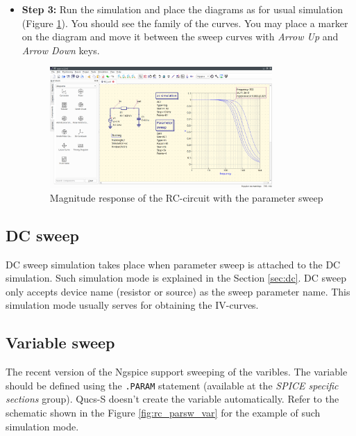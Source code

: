 \documentclass[a4paper,12pt]{article}
\begin{document}
\begin{itemize}
\item \textbf{Step 3:} Run the simulation and place the diagrams as for usual simulation (Figure \ref{fig:parsw_mr}). You should see the family of the curves. You may place a marker on the diagram and move it between the sweep curves with \emph{Arrow Up} and \emph{Arrow Down} keys.  
    
        \begin{figure}[!ht]
        \begin{center}
            \includegraphics[width=0.8\textwidth]{img/parsw_mr.png}
        \end{center}
        \caption{Magnitude response of the RC-circuit with the parameter sweep} 
    \label{fig:parsw_mr}
    \end{figure}
    
\end{itemize}


\subsection{DC sweep}

DC sweep simulation takes place when parameter sweep is attached to the DC simulation. Such simulation mode is explained in
the Section \ref{sec:dc}. DC sweep only accepts device name (resistor or source) as the sweep parameter name. This simulation mode
usually serves for obtaining the IV-curves. 

\subsection{Variable sweep}

The recent version of the Ngspice support sweeping of the varibles. The variable should be defined using the \verb|.PARAM| 
statement (available at the \emph{SPICE specific sections} group). Qucs-S doesn't create the variable automatically. Refer to the schematic shown in the Figure \ref{fig:rc_parsw_var} for the example of such simulation mode.
\end{document}
